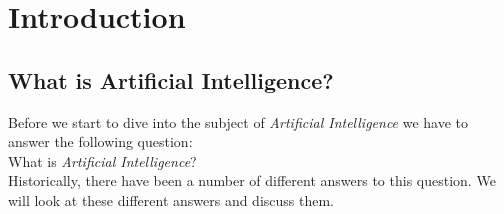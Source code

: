 \chapter{Introduction}

\section{What is Artificial Intelligence?}
Before we start to dive into the subject of \emph{Artificial Intelligence} we have to answer the following question:
\\[0.2cm]
\hspace*{1.3cm}
What is \emph{Artificial Intelligence}? 
\\[0.2cm] 
Historically, there have been a number of different answers to this question.  We will look at these
different answers and discuss them.
